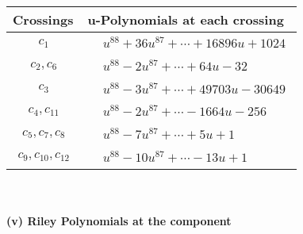 \documentclass[1p]{elsarticle_modified}
\theoremstyle{definition}
\begin{document}
\begin{tabular}{m{50pt}|m{274pt}}
Crossings & \hspace{64pt}u-Polynomials at each crossing \\
\hline $$\begin{aligned}c_{1}\end{aligned}$$&$\begin{aligned}
&u^{88}+36 u^{87}+\cdots+16896 u+1024
\end{aligned}$\\
\hline $$\begin{aligned}c_{2},c_{6}\end{aligned}$$&$\begin{aligned}
&u^{88}-2 u^{87}+\cdots+64 u-32
\end{aligned}$\\
\hline $$\begin{aligned}c_{3}\end{aligned}$$&$\begin{aligned}
&u^{88}-3 u^{87}+\cdots+49703 u-30649
\end{aligned}$\\
\hline $$\begin{aligned}c_{4},c_{11}\end{aligned}$$&$\begin{aligned}
&u^{88}-2 u^{87}+\cdots-1664 u-256
\end{aligned}$\\
\hline $$\begin{aligned}c_{5},c_{7},c_{8}\end{aligned}$$&$\begin{aligned}
&u^{88}-7 u^{87}+\cdots+5 u+1
\end{aligned}$\\
\hline $$\begin{aligned}c_{9},c_{10},c_{12}\end{aligned}$$&$\begin{aligned}
&u^{88}-10 u^{87}+\cdots-13 u+1
\end{aligned}$\\
\hline
\end{tabular}\\~\\
\newpage\renewcommand{\arraystretch}{1}
\flushleft \textbf{(v) Riley Polynomials at the component}\newline \\
\end{document}
